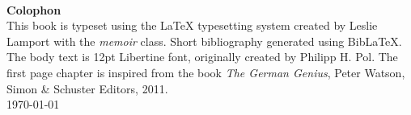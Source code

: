 \documentclass[a4paper,12pt,english,twoside,openright]{memoir}
\begin{document}
	{\centering
		\aldine\\
		\aldine\hspace{1.2em}\aldine
		\par}
	\vspace*{2cm}
	
	
\backmatter

\newpage
\thispagestyle{empty}
\centering
\textbf{Colophon}\\
This book is typeset using the \LaTeX{} typesetting system created by Leslie Lamport with the \emph{memoir} class. Short bibliography generated using BibLaTeX. The body text is 12pt Libertine font, originally created by Philipp H. Pol. The first page chapter is inspired from the book \emph{The German Genius}, Peter Watson, Simon \& Schuster Editors, 2011.\\

\bigskip
\today
{}
\end{document}
